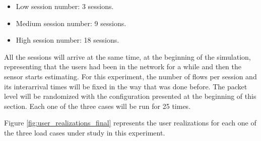 \begin{itemize}
\item Low session number: 3 sessions.
\item Medium session number: 9 sessions.
\item High session number: 18 sessions.
\end{itemize}

All the sessions will arrive at the same time, at the beginning of the simulation, representing that the users had been in the network for a while and then the sensor starts estimating. For this experiment, the number of flows per session and its interarrival times will be fixed in the way that was done before. The packet level will be randomized with the configuration presented at the beginning of this section. Each one of the three cases will be run for 25 times.

Figure \ref{fig:user_realizations_final} represents the user realizations for each one of the three load cases under study in this experiment.

